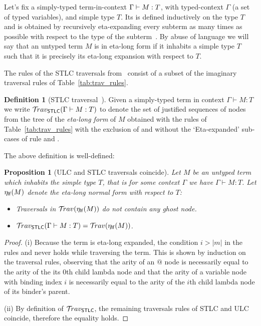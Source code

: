 \documentclass{article}
\theoremstyle{plain}
\newtheorem{proposition}[theorem]{Proposition}
\theoremstyle{definition}
\newtheorem{definition}{Definition}[section]
\theoremstyle{remark}
\newcommand{\ghostlmd}{{\lambda\!\!\lambda}}
\newcommand{\travulc}{\travset}
\newcommand{\travstlc}{{\travset_{\sf STLC}}}
\begin{document}
Let's fix a simply-typed term-in-context $\Gamma \vdash M :T$, with typed-context $\Gamma$ (a set of typed variables), and simple type $T$. Its  is defined inductively on the type $T$ and is obtained by recursively eta-expanding every subterm as many times as possible with respect to the type of the subterm~\cite{Ong2006,BlumPhd}.
By abuse of language we will say that an untyped term $M$ is in eta-long form if it inhabits a simple type $T$ such that it is precisely its eta-long expansion with respect to $T$.

The rules of the STLC traversals from~\cite{BlumPhd} consist of a subset of the imaginary traversal rules of Table~\ref{tab:trav_rules}.

\begin{definition}[STLC traversal~\cite{BlumPhd}]
Given a simply-typed term in context $\Gamma \vdash M : T$ we write $\travstlc(\Gamma \vdash M : T)$ to denote the set of justified sequences of nodes from the tree of the \emph{eta-long form} of $M$ obtained with the rules of Table~\ref{tab:trav_rules} with the exclusion of \rulenamet{Lam^\ghostlmd} and without the `Eta-expanded' sub-cases of rule  and .
\end{definition}

The above definition is well-defined:
\begin{proposition}[ULC and STLC traversals coincide]
\label{prop:ulc_and_stlc_trav_coincide}
Let $M$ be an untyped term which inhabits the simple type $T$, that is for some context $\Gamma$ we have $\Gamma \vdash M : T$. Let $\eta_{\sf lf}(M)$ denote the \emph{eta-long normal form} with respect to $T$:
\begin{itemize}
\item[(i)] Traversals in $\travulc(\etalf{M})$ do not contain any ghost node.
\item[(ii)] $\travstlc(\Gamma \vdash M : T) = \travulc(\etalf{M})$.
\end{itemize}
\end{proposition}
\begin{proof}
(i) Because the term is eta-long expanded, the condition $i>|m|$ in the rules  and  never holds while traversing the term.  This is shown by induction on the traversal rules, observing that the arity of an $@$ node is necessarily equal to the arity of the its $0$th child lambda node and that the arity of a variable node with binding index $i$ is necessarily equal to the arity of the $i$th child lambda node of its binder's parent.

(ii) By definition of $\travstlc$, the remaining traversals rules of STLC and ULC coincide, therefore the equality holds.
\end{proof}
\end{document}

